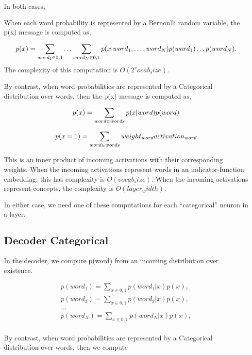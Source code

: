 In both cases, 

When each word probability is represented by a Bernoulli random variable, the p(x) message is computed as,

\begin{equation}
    p(x) = \sum_{word_1 \in 0,1}\ldots \sum_{word_N \in 0,1} p(x|word_1, \ldots, word_N)p(word_1)\ldots p(word_N).  \\
\end{equation}
The complexity of this computation is $O(2^vocab_size)$.


By contrast, when word probabilities are represented by a Categorical distribution over words, then the p(x) message is computed as,

\begin{equation}
    p(x) = \sum_{word \in words} p(x|word)p(word) \\
\end{equation}

\begin{equation}
    p(x=1) = \sum_{word \in words} weight_{word} activation_{word} \\
\end{equation}

This is an inner product of incoming activations with their corresponding weights.  When the incoming activations represent words in an indicator-function embedding, this has complexity is $O(vocab_size)$.  When the incoming activations represent concepts, the complexity is $O(layer_width)$.  

In either case, we need one of these computations for each ``categorical'' neuron in a layer.

\subsection{Decoder Categorical}

In the decoder, we compute p(word) from an incoming distribution over existence.

\begin{eqnarray}
    p(word_1) = \sum_{x \in 0,1} p(word_1 | x)p(x), \\
    p(word_2) = \sum_{x \in 0,1} p(word_2 | x)p(x), \\
    \ldots \\
    p(word_N) = \sum_{x \in 0,1} p(word_N | x)p(x), \\
\end{eqnarray}

By contrast, when word probabilities are represented by a Categorical distribution over words, then we compute

